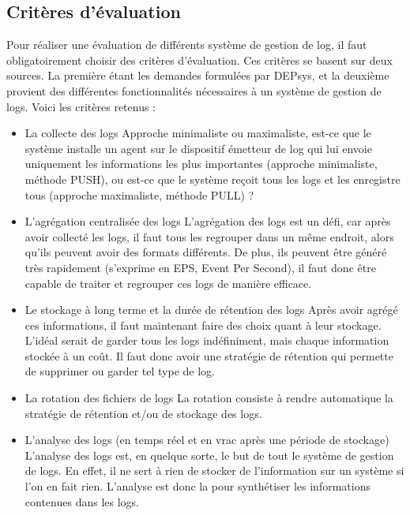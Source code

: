 \documentclass[paper=a4, fontsize=11pt]{scrartcl}
\begin{document}
\subsection{Critères d'évaluation}

Pour réaliser une évaluation de différents système de gestion de log, il faut obligatoirement choisir des critères d'évaluation. Ces critères se basent sur deux sources. La première étant les demandes formulées par DEPsys, et la deuxième provient des différentes fonctionnalités nécessaires à un système de gestion de logs. Voici les critères retenus :

\begin{itemize}\itemsep0pt \parskip0pt 
\item La collecte des logs
\subitem Approche minimaliste ou maximaliste, est-ce que le système installe un agent sur le dispositif émetteur de log qui lui envoie uniquement les informations les plus importantes (approche minimaliste, méthode PUSH), ou est-ce que le système reçoit tous les logs et les enregistre tous (approche maximaliste, méthode PULL) ?\\
\item L'agrégation centralisée des logs
\subitem L'agrégation des logs est un défi, car après avoir collecté les logs, il faut tous les regrouper dans un même endroit, alors qu'ils peuvent avoir des formats différents. De plus, ils peuvent être généré très rapidement (s'exprime en EPS, Event Per Second), il faut donc être capable de traiter et regrouper ces logs de manière efficace.\\
\item Le stockage à long terme et la durée de rétention des logs
\subitem Après avoir agrégé ces informations, il faut maintenant faire des choix quant à leur stockage. L'idéal serait de garder tous les logs indéfiniment, mais chaque information stockée à un coût. Il faut donc avoir une stratégie de rétention qui permette de supprimer ou garder tel type de log.\\
\item La rotation des fichiers de logs
\subitem La rotation consiste à rendre automatique la stratégie de rétention et/ou de stockage des logs.\\
\item L'analyse des logs (en temps réel et en vrac après une période de stockage)
\subitem L'analyse des logs est, en quelque sorte, le but de tout le système de gestion de logs. En effet, il ne sert à rien de stocker de l'information sur un système si l'on en fait rien. L'analyse est donc la pour synthétiser les informations contenues dans les logs.\\

\end{itemize}
\end{document}
